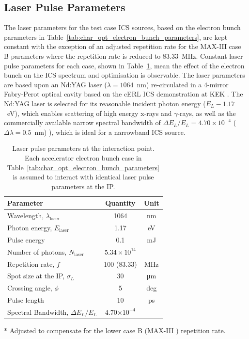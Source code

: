 \documentclass[../main.tex]{subfiles}
\begin{document}
\subsection{Laser Pulse Parameters}

The laser parameters for the test case ICS sources, based on the electron bunch parameters in Table~\ref{tab:char_opt_electron_bunch_parameters}, are kept constant with the exception of an adjusted repetition rate for the MAX-III case B parameters where the repetition rate is reduced to 83.33~\si{\mega\hertz}. Constant laser pulse parameters for each case, shown in Table~\ref{tab:char_opt_laser_pulse_parameters}, mean the effect of the electron bunch on the ICS spectrum and optimisation is observable. The laser parameters are based upon an Nd:YAG laser ($\lambda = 1064$~\si{\nano\meter}) re-circulated in a 4-mirror Fabry-Perot optical cavity based on the cERL ICS demonstration at KEK \cite{akagi2016narrow}. The Nd:YAG laser is selected for its reasonable incident photon energy ($E_{L}-1.17$~\si{\electronvolt}), which enables scattering of high energy x-rays and $\gamma$-rays, as well as the commercially available narrow spectral bandwidth of $\Delta E_{L}/E_{L} = 4.70\times 10^{-4}$  ($\Delta\lambda = 0.5$~\si{\nano\meter}) \cite{thorlabs2021ndyag200}), which is ideal for a narrowband ICS source.

\begin{table}[!h]
\centering
\caption{Laser pulse parameters at the interaction point. Each accelerator electron bunch case in Table~\ref{tab:char_opt_electron_bunch_parameters} is assumed to interact with identical laser pulse parameters at the IP.}
\vspace{3mm}
\begin{threeparttable}
\begin{tabular}{lcc}
\hline\hline
Parameter & Quantity & Unit \\
\hline
Wavelength, $\lambda_\textrm{laser}$ & 1064 & nm\\
Photon energy, $E_\textrm{laser}$ & 1.17 & eV\\
Pulse energy  & 0.1 & \si{\milli\joule}\\
Number of photons, $N_{\textrm{laser}}$ & $5.34\times 10^{14}$\\ 
Repetition rate, $f$ & 100 (83.33)\tnote{*} & MHz\\
Spot size at the IP, $\sigma_{L}$ & 30 & \si{\micro\meter}\\
Crossing angle, $\phi$ & 5 & deg \\
Pulse length  & 10 & ps\\
Spectral Bandwidth, $\Delta E_{L}/E_{L}$ & 4.70$\times 10^{-4}$ &   \\
\hline\hline
\end{tabular}
\begin{tablenotes}
\item[*]{Adjusted to compensate for the lower case B (MAX-III \cite{sjostrom2009max,rosborg2012electron}) repetition rate.}
\end{tablenotes}
\end{threeparttable}
\label{tab:char_opt_laser_pulse_parameters}
\end{table}
\end{document}
